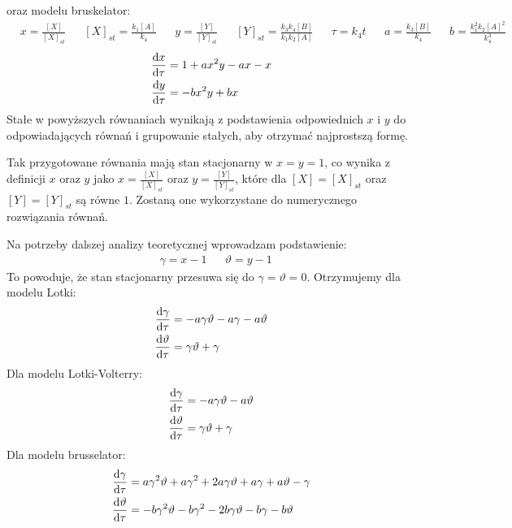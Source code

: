 \documentclass[10pt, a4paper, twoside, onecolumn]{article}
\numberwithin{equation}{section}
\begin{document}
	oraz modelu bruskelator:
	\begin{align*}
		& x=\frac{[X]}{[X]_{st}} && [X]_{st} = \frac{k_{1}[A]}{k_{4}} && y=\frac{[Y]}{[Y]_{st}} && [Y]_{st} = \frac{k_{3}k_{4}[B]}{k_{1}k_{2}[A]} && \tau=k_{4}t && a=\frac{k_{3}[B]}{k_{4}} && b=\frac{k_{1}^{2}k_{2}[A]^{2}}{k_{4}^{3}}
	\end{align*}
	\begin{equation}\label{bruskelator_prosty}
	\begin{split}
		\dv{x}{\tau} &= 1+ax^{2}y-ax-x \\
		\dv{y}{\tau} &= -bx^{2}y+bx
	\end{split}
	\end{equation}
	Stałe w powyższych równaniach wynikają z podstawienia odpowiednich \(x\) i \(y\) do odpowiadających równań i grupowanie stałych, aby otrzymać najprostszą formę. \par
	Tak przygotowane równania mają stan stacjonarny w \(x=y=1\), co wynika z definicji \(x\) oraz \(y\) jako \(x=\frac{[X]}{[X]_{st}}\) oraz \(y=\frac{[Y]}{[Y]_{st}}\), które dla \([X]=[X]_{st}\) oraz \([Y]=[Y]_{st}\) są równe \(1\). Zostaną one wykorzystane do numerycznego rozwiązania równań. \par
	Na potrzeby dalszej analizy teoretycznej wprowadzam podstawienie:
	\begin{align*}
		& \gamma=x-1 && \vartheta=y-1
	\end{align*}
	To powoduje, że stan stacjonarny przesuwa się do \(\gamma=\vartheta=0\). Otrzymujemy dla modelu Lotki:
	\begin{equation}\label{lotka_0}
	\begin{split}
		\dv{\gamma}{\tau} &= -a\gamma\vartheta-a\gamma-a\vartheta \\
		\dv{\vartheta}{\tau} &= \gamma\vartheta+\gamma
	\end{split}
	\end{equation}
	Dla modelu Lotki-Volterry:
	\begin{equation}\label{lotka_volterra_0}
	\begin{split}
		\dv{\gamma}{\tau} &= -a\gamma\vartheta-a\vartheta \\
		\dv{\vartheta}{\tau} &= \gamma\vartheta+\gamma
	\end{split}
	\end{equation}
	Dla modelu brusselator:
	\begin{equation}\label{bruskelator_0}
	\begin{split}
		\dv{\gamma}{\tau} &= a\gamma^{2}\vartheta+a\gamma^{2}+2a\gamma\vartheta+a\gamma+a\vartheta-\gamma \\
		\dv{\vartheta}{\tau} &= -b\gamma^{2}\vartheta-b\gamma^{2}-2b\gamma\vartheta-b\gamma-b\vartheta
	\end{split}
	\end{equation}
\end{document}
